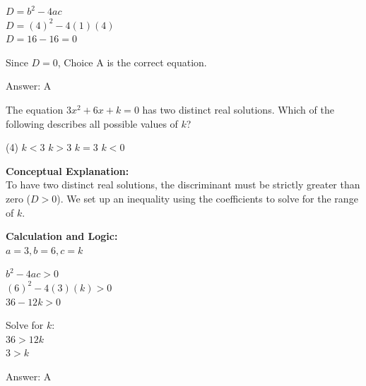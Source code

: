 \documentclass[11pt,paper=a4,answers]{exam}
\begin{document}
\begin{questions}
\begin{solution}
\vspace{10pt}

$D = b^2 - 4ac$ \\
$D = (4)^2 - 4(1)(4)$ \\
$D = 16 - 16 = 0$

\vspace{10pt}

Since $D = 0$, Choice A is the correct equation.

\vspace{25pt}

Answer: \colorbox{yellow!100}{A}
\end{solution}

\vspace{40pt}

\question
The equation $3x^2 + 6x + k = 0$ has two distinct real solutions. Which of the following describes all possible values of $k$?
\begin{tasks}(4)
    \task $k < 3$
    \task $k > 3$
    \task $k = 3$
    \task $k < 0$
\end{tasks}

\begin{solution}
\textbf{Conceptual Explanation:} \\
To have two distinct real solutions, the discriminant must be strictly greater than zero ($D > 0$). We set up an inequality using the coefficients to solve for the range of $k$.

\vspace{20pt}

\textbf{Calculation and Logic:} \\
$a = 3, b = 6, c = k$

\vspace{10pt}

$b^2 - 4ac > 0$ \\
$(6)^2 - 4(3)(k) > 0$ \\
$36 - 12k > 0$

\vspace{10pt}

Solve for $k$: \\
$36 > 12k$ \\
$3 > k$

\vspace{25pt}

Answer: \colorbox{yellow!100}{A}
\end{solution}

\vspace{40pt}


\end{questions}
\end{document}
